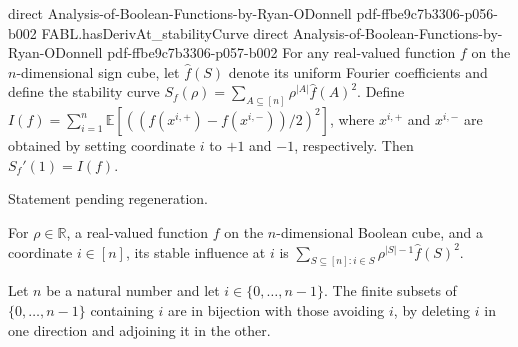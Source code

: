 \begin{theorem}
  {direct}
  {Analysis-of-Boolean-Functions-by-Ryan-ODonnell}
  {pdf-ffbe9c7b3306-p056-b002}
\proofstep
  {FABL.hasDerivAt_stabilityCurve}
  {direct}
  {Analysis-of-Boolean-Functions-by-Ryan-ODonnell}
  {pdf-ffbe9c7b3306-p057-b002}
For any real-valued function $f$ on the $n$-dimensional sign cube, let $\widehat f(S)$
denote its uniform Fourier coefficients and define the stability curve
$S_f(\rho)=\sum_{A\subseteq[n]}\rho^{|A|}\widehat f(A)^2$. Define
$I(f)=\sum_{i=1}^n\mathbb{E}[((f(x^{i,+})-f(x^{i,-}))/2)^2]$, where $x^{i,+}$ and
$x^{i,-}$ are obtained by setting coordinate $i$ to $+1$ and $-1$, respectively. Then
$S_f'(1)=I(f)$.
\end{theorem}

\begin{theorem}
\label{FABL.fourierCoeff_discreteDerivative}
\leanok
{}
Statement pending regeneration.
\end{theorem}

\begin{definition}
\label{FABL.stableInfluence}
\leanok
{}
For $\rho\in\mathbb{R}$, a real-valued function $f$ on the $n$-dimensional Boolean cube,
and a coordinate $i\in[n]$, its stable influence at $i$ is $\sum_{S\subseteq[n]: i\in
S}\rho^{|S|-1}\widehat f(S)^2$.
\end{definition}

\begin{definition}
\label{FABL.eraseContainingEquiv}
\leanok
Let $n$ be a natural number and let $i\in\{0,\ldots,n-1\}$. The finite subsets of
$\{0,\ldots,n-1\}$ containing $i$ are in bijection with those avoiding $i$, by deleting
$i$ in one direction and adjoining it in the other.
\end{definition}

